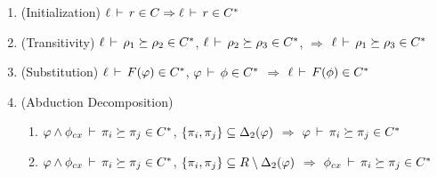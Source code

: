 \begin{enumerate}

\item (Initialization) $\ell\,\vdash\,r \in C \Rightarrow \ell\,\vdash\,r \in {C}^*$

\item (Transitivity)
$\ell\,\vdash\,\rho_1 \succeq \rho_2 \in {C}^*$,
$\ell\,\vdash\,\rho_2 \succeq \rho_3 \in {C}^*$,
$\Rightarrow$
$\ell\,\vdash\,\rho_1 \succeq \rho_3 \in {C}^*$

\item (Substitution)
$\ell\,\vdash\,F(\varphi) \in {C}^*$,
$\varphi\,\vdash\,\phi \in {C}^*$
$\Rightarrow$ $\ell\,\vdash\,F(\phi) \in {C}^*$

\item (Abduction Decomposition)
\label{item:context}
\begin{enumerate}
\item
$\varphi \wedge \phi_{cx}\,\vdash\,\pi_i \succeq \pi_j \in {C}^*$,
$\{ \pi_i, \pi_j \} \subseteq {\Delta_2}(\varphi)$
$\Rightarrow$
$\varphi\,\vdash\,\pi_i \succeq \pi_j \in {C}^* $

\item 
$\varphi \wedge \phi_{cx}\,\vdash\,\pi_i \succeq \pi_j \in {C}^*$,
$\{ \pi_i, \pi_j \} \subseteq R \setminus {\Delta_2}(\varphi)$
$\Rightarrow$
$\phi_{cx}\,\vdash\,\pi_i \succeq \pi_j \in {C}^* $
\end{enumerate}

%
%
\end{enumerate}


